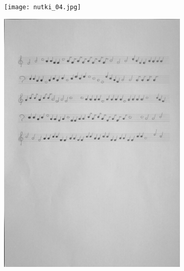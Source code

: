 \documentclass[11pt]{article}
\begin{document}
\begin{figure}
    \centering
    \begin{subfigure}{.5\textwidth}
        \centering
        \graphicspath{ {Resources/} }
        \texttt{[image: nutki\_04.jpg]}
        \label{fig:sub1}
    \end{subfigure}%
    \begin{subfigure}{.5\textwidth}
        \centering
        \graphicspath{ {output/} }
        \includegraphics[width=.9\linewidth]{warped4_gray.jpg}
        \label{fig:sub2}
    \end{subfigure}
    \label{fig:test}
\end{figure}
\end{document}
